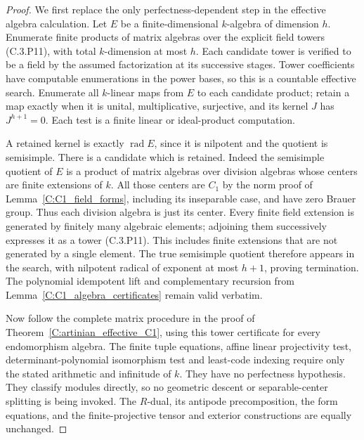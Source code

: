 \begin{proof}
We first replace the only perfectness-dependent step in
the effective algebra calculation.
Let $E$ be a finite-dimensional $k$-algebra of dimension $h$.
Enumerate finite products of matrix algebras over the
explicit field towers (C.3.P11), with total $k$-dimension
at most $h$. Each candidate tower is verified to be a
field by the assumed factorization at its successive
stages. Tower coefficients have computable enumerations
in the power bases, so this is a countable effective
search. Enumerate all $k$-linear maps from $E$ to each
candidate product; retain a map exactly when it is
unital, multiplicative, surjective, and its kernel
$J$ has $J^{h+1}=0$. Each test is a finite linear or
ideal-product computation.

A retained kernel is exactly $\operatorname{rad}E$,
since it is nilpotent and the quotient is semisimple.
There is a candidate which is retained. Indeed the
semisimple quotient of $E$ is a product of matrix
algebras over division algebras whose centers are
finite extensions of $k$. All those centers are
$C_1$ by the norm proof of Lemma~\ref{C:C1_field_forms},
including its inseparable case, and have zero Brauer
group. Thus each division algebra is just its center.
Every finite field extension is generated by finitely
many algebraic elements; adjoining them successively
expresses it as a tower (C.3.P11).
This includes finite extensions that are not generated
by a single element. The true semisimple quotient
therefore appears in the search, with nilpotent
radical of exponent at most $h+1$, proving termination.
The polynomial idempotent lift and complementary
recursion from Lemma~\ref{C:C1_algebra_certificates}
remain valid verbatim.

Now follow the complete matrix procedure in the proof
of Theorem~\ref{C:artinian_effective_C1}, using this
tower certificate for every endomorphism algebra.
The finite tuple equations, affine linear projectivity
test, determinant-polynomial isomorphism test and
least-code indexing require only the stated arithmetic
and infinitude of $k$. They have no perfectness
hypothesis. They classify modules directly, so no
geometric descent or separable-center splitting
is being invoked.
The $R$-dual, its antipode precomposition, the form
equations, and the finite-projective tensor and
exterior constructions are equally unchanged.


\end{proof}

